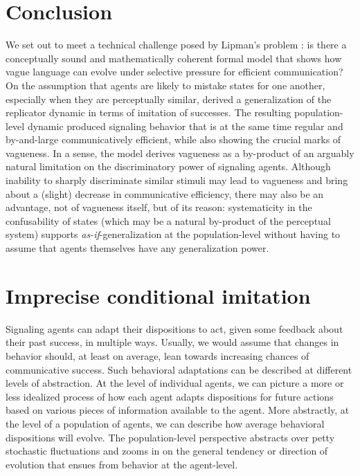 \documentclass[fleqn,reqno,10pt]{article}
\begin{document}

\section{Conclusion}
\label{sec:conclusion}

We set out to meet a technical challenge posed by Lipman's problem
\citep{Lipman2009:Why-is-Language}: is there a conceptually sound and mathematically coherent
formal model that shows how vague language can evolve under selective pressure for efficient
communication? On the assumption that agents are likely to mistake states for one another,
especially when they are perceptually similar, derived a generalization of the replicator
dynamic in terms of imitation of successes. The resulting population-level dynamic produced
signaling behavior that is at the same time regular and by-and-large communicatively efficient,
while also showing the crucial marks of vagueness. In a sense, the model derives vagueness as a
by-product of an arguably natural limitation on the discriminatory power of signaling agents.
Although inability to sharply discriminate similar stimuli may lead to vagueness and bring about
a (slight) decrease in communicative efficiency, there may also be an advantage, not of
vagueness itself, but of its reason: systematicity in the confusability of states (which may be
a natural by-product of the perceptual system) supports \emph{as-if}-generalization at the
population-level without having to assume that agents themselves have any generalization power.



\appendix

\section{Imprecise conditional imitation}
\label{sec:repl-diff-dynam}

Signaling agents can adapt their dispositions to act, given some feedback about their past
success, in multiple ways. Usually, we would assume that changes in behavior should, at least
on average, lean towards increasing chances of communicative success. Such behavioral
adaptations can be described at different levels of abstraction. At the level of individual
agents, we can picture a more or less idealized process of how each agent adapts dispositions
for future actions based on various pieces of information available to the agent. More
abstractly, at the level of a population of agents, we can describe how average behavioral
dispositions will evolve. The population-level perspective abstracts over petty stochastic
fluctuations and zooms in on the general tendency or direction of evolution that ensues from
behavior at the agent-level.
\end{document}
